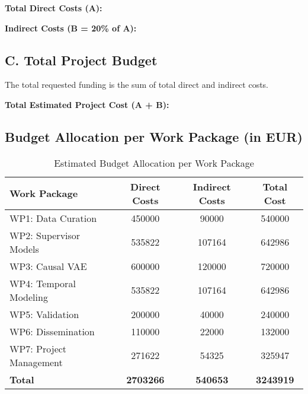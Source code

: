 \textbf{Total Direct Costs (A): }

\textbf{Indirect Costs (B = 20\% of A): }

\subsection*{C. Total Project Budget}
The total requested funding is the sum of total direct and indirect costs.

\textbf{Total Estimated Project Cost (A + B):} 

\subsection*{Budget Allocation per Work Package (in EUR)}

\begin{table}[H]
\centering
\caption{Estimated Budget Allocation per Work Package}
\label{tab:budget_wp}
\begin{tabular}{lS[table-format=7.0]S[table-format=6.0]S[table-format=7.0]}
\toprule
\textbf{Work Package} & {\textbf{Direct Costs}} & {\textbf{Indirect Costs}} & {\textbf{Total Cost}} \\
\midrule
WP1: Data Curation & 450000 & 90000 & 540000 \\
WP2: Supervisor Models & 535822 & 107164 & 642986 \\
WP3: Causal VAE & 600000 & 120000 & 720000 \\
WP4: Temporal Modeling & 535822 & 107164 & 642986 \\
WP5: Validation & 200000 & 40000 & 240000 \\
WP6: Dissemination & 110000 & 22000 & 132000 \\
WP7: Project Management & 271622 & 54325 & 325947 \\
\midrule
\textbf{Total} & {\textbf{2703266}} & {\textbf{540653}} & {\textbf{3243919}} \\
\bottomrule
\end{tabular}
\end{table}